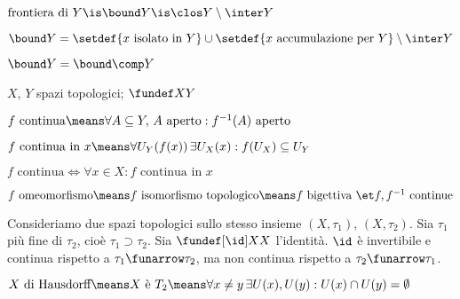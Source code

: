 \begin{defn}
$\text{frontiera di }Y\is\bound Y\is\clos Y\setminus\inter Y$
\end{defn}

\begin{prop}
$\bound Y=\setdef{x\text{ isolato in }Y}\cup\setdef{x\text{ accumulazione per }Y}\setminus\inter Y$
\end{prop}


\begin{prop}
$\bound Y=\bound\comp Y$
\end{prop}


$X$, $Y$ spazi topologici; $\fundef XY$

\begin{defn}[Continuità]
$f\text{ continua}\means\forall A\subseteq Y,\,A\text{ aperto}:f^{-1}(A)\text{ aperto}$
\end{defn}

\begin{defn}
$f\text{ continua in }x\means\forall U_Y(f(x))\,\exists U_X(x):f(U_X)\subseteq U_Y$
\end{defn}

\begin{prop}
$f\text{ continua}\iff\forall x\in X:f\text{ continua in }x$
\end{prop}

\begin{defn}
$f\text{ omeomorfismo}\means f\text{ isomorfismo topologico}\means f\text{ bigettiva }\et f, f^{-1}\text{ continue}$
\end{defn}

\begin{es}
Consideriamo due spazi topologici sullo stesso insieme $(X,\tau_1)$, $(X,\tau_2)$. Sia $\tau_1$ più fine di $\tau_2$, cioè $\tau_1\supset\tau_2$. Sia $\fundef[\id]XX$ l'identità. $\id$ è invertibile e continua rispetto a $\tau_1\funarrow\tau_2$, ma non continua rispetto a $\tau_2\funarrow\tau_1$.
\end{es}


\begin{defn}
$X\text{ di Hausdorff}\means X\text{ è }T_2\means\forall x\neq y\,\exists U(x),U(y):U(x)\cap U(y)=\emptyset$
\end{defn}

